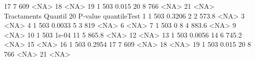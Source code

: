 \documentclass[11pt,a4paper]{article}\usepackage[]{graphicx}\usepackage[]{color}
\begin{document}
17           7        609                 <NA>
18                                        <NA>
19           1        503                0.015
20           8        766                 <NA>
21                                        <NA>
   Tractaments Quantil 20 P-value quantileTest
1            1        503               0.3206
2            2      573.8                 <NA>
3                                         <NA>
4            1        503               0.0033
5            3        819                 <NA>
6                                         <NA>
7            1        503                    0
8            4      883.6                 <NA>
9                                         <NA>
10           1        503                1e-04
11           5      865.8                 <NA>
12                                        <NA>
13           1        503               0.0056
14           6      745.2                 <NA>
15                                        <NA>
16           1        503               0.2954
17           7        609                 <NA>
18                                        <NA>
19           1        503                0.015
20           8        766                 <NA>
21                                        <NA>
\end{document}
